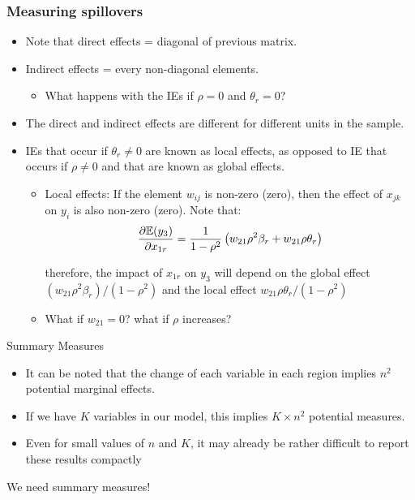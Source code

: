 \documentclass[english,10pt]{beamer}\usepackage[]{graphicx}\usepackage[]{xcolor}
\begin{document}
\begin{frame}
    \frametitle{Measuring spillovers}
    \begin{itemize}
      \item Note that direct effects =  diagonal of previous matrix. 
      \item Indirect effects = every non-diagonal elements.
        \begin{itemize}
          \item What happens with the IEs if $\rho = 0$ and $\theta_r = 0$?
        \end{itemize}
      \item The direct and indirect effects are different for different units in the sample. 
      \item IEs that occur if $\theta_r \neq 0$ are known as \alert{local effects}, as opposed to IE that occurs if $\rho \neq 0$ and that are known as \alert{global effects}.
        \begin{itemize}
          \item Local  effects: If the element $w_{ij}$ is non-zero (zero), then the effect of $x_{jk}$ on $y_i$ is also non-zero (zero). Note that:
              \begin{equation*}
                \frac{\partial \mathbb{E}(y_3)}{\partial x_{1r}} = \frac{1}{1 - \rho^2}\left(w_{21}\rho^2\beta_r + w_{21}\rho\theta_r\right)
              \end{equation*}
              
              therefore, the impact of $x_{1r}$ on $y_3$ will depend on the global effect $(w_{21}\rho^2 \beta_r)/(1 - \rho^2)$ and the local effect $w_{21}\rho\theta_r / (1 - \rho^2)$
          \item What if $w_{21}=0$? what if $\rho$ increases?
        \end{itemize}
    \end{itemize}
\end{frame}


\begin{frame}{Summary Measures}
  \begin{itemize}
    \item It can be noted that the change of each variable in each region implies $n^2$ potential marginal effects.  
    \item If we have $K$ variables in our model, this implies $K\times n^2$ potential measures.
    \item Even for small values of $n$ and $K$, it may already be rather difficult to report these results compactly
  \end{itemize}
  \begin{alertblock}{}
    We need summary measures!
  \end{alertblock}
\end{frame}
\end{document}
